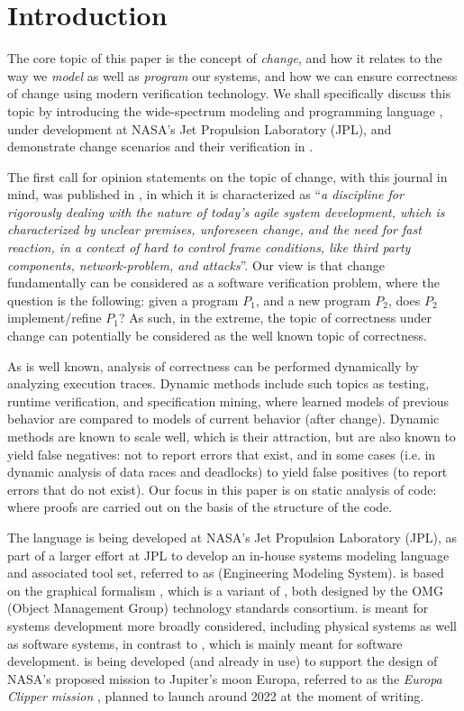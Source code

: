 
\section{Introduction}

The core topic of this paper is the concept of {\em change}, and how
it relates to the way we {\em model} as well as {\em program} our
systems, and how we can ensure correctness of change using modern
verification technology.  We shall specifically discuss this topic by
introducing the wide-spectrum modeling and programming language
\Klang, under development at NASA's Jet Propulsion Laboratory (JPL),
and demonstrate change scenarios and their verification in \Klang.

The first call for opinion statements on the topic of change, with
this journal in mind, was published in \cite{steffen-isola-2014}, in
which it is characterized as ``{\em a discipline for rigorously
  dealing with the nature of today's agile system development, which
  is characterized by unclear premises, unforeseen change, and the
  need for fast reaction, in a context of hard to control frame
  conditions, like third party components, network-problem, and
  attacks}''.
%
Our view is that change fundamentally can be considered as a software
verification problem, where the question is the following: given a
program $P_1$, and a new program $P_2$, does $P_2$ implement/refine
$P_1$?  As such, in the extreme, the topic of correctness under change
can potentially be considered as the well known topic of correctness.

As is well known, analysis of correctness can be performed dynamically
by analyzing execution traces. Dynamic methods include such topics as
testing, runtime verification, and specification mining, where learned
models of previous behavior are compared to models of current behavior
(after change). Dynamic methods are known to scale well, which is
their attraction, but are also known to yield false negatives: not to
report errors that exist, and in some cases (i.e. in dynamic analysis of
data races and deadlocks) to yield false positives (to report errors
that do not exist). Our focus in this paper is on static analysis of
code: where proofs are carried out on the basis of the structure of
the code.

The \Klang{} language is being developed at NASA's Jet Propulsion
Laboratory (JPL), as part of a larger effort at JPL to develop an
in-house systems modeling language and associated tool set, referred
to as \ems{} (Engineering Modeling System). \ems{} is based on the
graphical \sysml{} formalism \cite{sysml}, which is a variant of
\uml{} \cite{uml}, both designed by the OMG (Object Management Group)
technology standards consortium. \sysml{} is meant for systems
development more broadly considered, including physical systems as
well as software systems, in contrast to \uml{}, which is mainly meant
for software development.  \ems{} is being developed (and already in
use) to support the design of NASA's proposed mission to Jupiter's
moon Europa, referred to as the {\em Europa Clipper mission}
\cite{europa-clipper}, planned to launch around 2022 at the moment of
writing.

